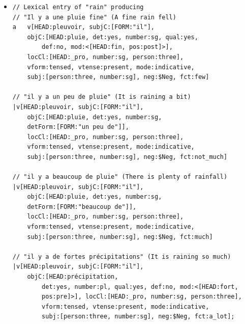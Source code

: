 \documentclass[11pt]{article}
\begin{document}
\begin{itemize}
\begin{verbatim}
//"Il fait très chaud" (It's very hot)
|v[HEAD:température, subjC:[FORM:"il"], modC:[HEAD:chaud, 
	number:sg, gender:ms, mod:<[HEAD:très]>], vform:tensed, 
	vtense:present, mode:indicative, subj:[person:three, 
	number:sg], neg:$Neg, fct:very_high]

//"Il fait très froid" (It's very cold)
|v[HEAD:température, subjC:[FORM:"il"], modC:[HEAD:froid, 
	number:sg, gender:ms, mod:<[HEAD:très]>], vform:tensed,
	vtense:present, mode:indicative, subj:[person:three, 
	number:sg], neg:$Neg, fct:very_low]

//"Il fait froid" (It's cold)
|v[HEAD:température, subjC:[FORM:"il"], modC:[HEAD:froid, 
	number:sg, gender:ms], vform:tensed, vtense:present, 
	mode:indicative, subj:[person:three, number:sg], 
	neg:$Neg, fct:low]; 
\end{verbatim}

	      \bigskip
	\item \begin{verbatim}
// Lexical entry of "rain" producing
// "Il y a une pluie fine" (A fine rain fell)
a	v[HEAD:pleuvoir, subjC:[FORM:"il"], 
	objC:[HEAD:pluie, det:yes, number:sg, qual:yes,
		def:no, mod:<[HEAD:fin, pos:post]>], 
	locCl:[HEAD:_pro, number:sg, person:three], 
	vform:tensed, vtense:present, mode:indicative, 
	subj:[person:three, number:sg], neg:$Neg, fct:few]
	
// "il y a un peu de pluie" (It is raining a bit)
|v[HEAD:pleuvoir, subjC:[FORM:"il"], 
	objC:[HEAD:pluie, det:yes, number:sg, 
	detForm:[FORM:"un peu de"]], 
	locCl:[HEAD:_pro, number:sg, person:three], 
	vform:tensed, vtense:present, mode:indicative, 
	subj:[person:three, number:sg], neg:$Neg, fct:not_much]

// "il y a beaucoup de pluie" (There is plenty of rainfall)
|v[HEAD:pleuvoir, subjC:[FORM:"il"], 
	objC:[HEAD:pluie, det:yes, number:sg, 
	detForm:[FORM:"beaucoup de"]], 
	locCl:[HEAD:_pro, number:sg, person:three], 
	vform:tensed, vtense:present, mode:indicative, 
	subj:[person:three, number:sg], neg:$Neg, fct:much]

// "il y a de fortes précipitations" (It is raining so much)
|v[HEAD:pleuvoir, subjC:[FORM:"il"], 
	objC:[HEAD:précipitation,
        det:yes, number:pl, qual:yes, def:no, mod:<[HEAD:fort,
        pos:pre]>], locCl:[HEAD:_pro, number:sg, person:three],
        vform:tensed, vtense:present, mode:indicative,
        subj:[person:three, number:sg], neg:$Neg, fct:a_lot]; 
\end{verbatim}

\end{itemize}
\end{document}
